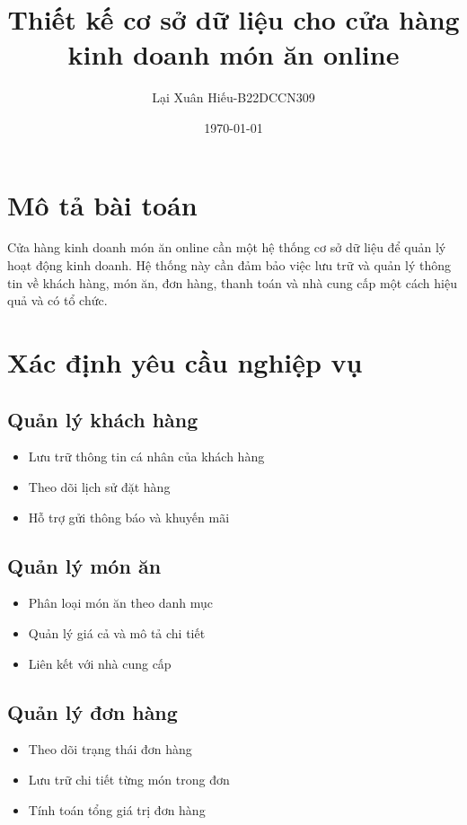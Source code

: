 \documentclass{article}
\title{Thiết kế cơ sở dữ liệu cho cửa hàng kinh doanh món ăn online}
\author{Lại Xuân Hiếu-B22DCCN309}
\date{\today}
\begin{document}
\maketitle

\tableofcontents

\section{Mô tả bài toán}
Cửa hàng kinh doanh món ăn online cần một hệ thống cơ sở dữ liệu để quản lý hoạt động kinh doanh. Hệ thống này cần đảm bảo việc lưu trữ và quản lý thông tin về khách hàng, món ăn, đơn hàng, thanh toán và nhà cung cấp một cách hiệu quả và có tổ chức.

\section{Xác định yêu cầu nghiệp vụ}

\subsection{Quản lý khách hàng}
\begin{itemize}
    \item Lưu trữ thông tin cá nhân của khách hàng
    \item Theo dõi lịch sử đặt hàng
    \item Hỗ trợ gửi thông báo và khuyến mãi
\end{itemize}

\subsection{Quản lý món ăn}
\begin{itemize}
    \item Phân loại món ăn theo danh mục
    \item Quản lý giá cả và mô tả chi tiết
    \item Liên kết với nhà cung cấp
\end{itemize}

\subsection{Quản lý đơn hàng}
\begin{itemize}
    \item Theo dõi trạng thái đơn hàng
    \item Lưu trữ chi tiết từng món trong đơn
    \item Tính toán tổng giá trị đơn hàng
\end{itemize}
\end{document}

